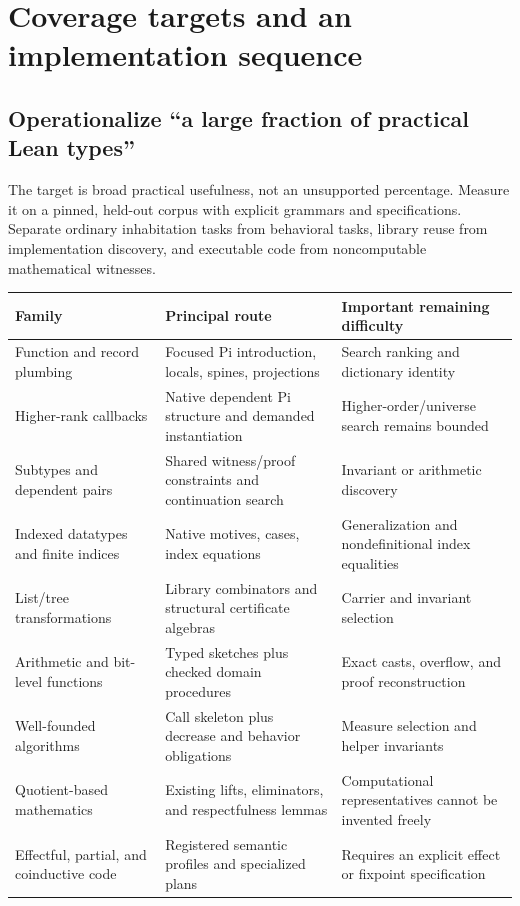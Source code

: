 \section{Coverage targets and an implementation sequence}
\label{sec:roadmap}
\subsection{Operationalize ``a large fraction of practical Lean types''}
The target is broad practical usefulness, not an unsupported percentage. Measure it on a pinned, held-out corpus with explicit grammars and specifications. Separate ordinary inhabitation tasks from behavioral tasks, library reuse from implementation discovery, and executable code from noncomputable mathematical witnesses.

\begin{longtable}{@{}L{0.24\textwidth}L{0.39\textwidth}L{0.29\textwidth}@{}}
\toprule
Family & Principal route & Important remaining difficulty \\
\midrule
\endhead
Function and record plumbing & Focused Pi introduction, locals, spines, projections & Search ranking and dictionary identity \\
Higher-rank callbacks & Native dependent Pi structure and demanded instantiation & Higher-order/universe search remains bounded \\
Subtypes and dependent pairs & Shared witness/proof constraints and continuation search & Invariant or arithmetic discovery \\
Indexed datatypes and finite indices & Native motives, cases, index equations & Generalization and nondefinitional index equalities \\
List/tree transformations & Library combinators and structural certificate algebras & Carrier and invariant selection \\
Arithmetic and bit-level functions & Typed sketches plus checked domain procedures & Exact casts, overflow, and proof reconstruction \\
Well-founded algorithms & Call skeleton plus decrease and behavior obligations & Measure selection and helper invariants \\
Quotient-based mathematics & Existing lifts, eliminators, and respectfulness lemmas & Computational representatives cannot be invented freely \\
Effectful, partial, and coinductive code & Registered semantic profiles and specialized plans & Requires an explicit effect or fixpoint specification \\
\bottomrule
\end{longtable}

